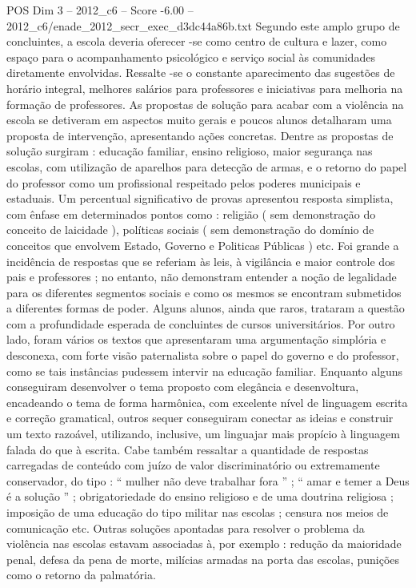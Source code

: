 \begin{textsample}{POS Dim 3 – 2012\_c6 – Score -6.00 – 2012\_c6/enade\_2012\_secr\_exec\_d3dc44a86b.txt}
Segundo este amplo grupo de concluintes, a escola deveria oferecer -se como centro de cultura e lazer, como espaço para o acompanhamento psicológico e serviço social às comunidades diretamente envolvidas.
Ressalte -se o constante aparecimento das sugestões de horário integral, melhores salários para professores e iniciativas para melhoria na formação de professores.
As propostas de solução para acabar com a violência na escola se detiveram em aspectos muito gerais e poucos alunos detalharam uma proposta de intervenção, apresentando ações concretas.
Dentre as propostas de solução surgiram : educação familiar, ensino religioso, maior segurança nas escolas, com utilização de aparelhos para detecção de armas, e o retorno do papel do professor como um profissional respeitado pelos poderes municipais e estaduais.
Um percentual significativo de provas apresentou resposta simplista, com ênfase em determinados pontos como : religião ( sem demonstração do conceito de laicidade ), políticas sociais ( sem demonstração do domínio de conceitos que envolvem Estado, Governo e Politicas Públicas ) etc.
Foi grande a incidência de respostas que se referiam às leis, à vigilância e maior controle dos pais e professores ; no entanto, não demonstram entender a noção de legalidade para os diferentes segmentos sociais e como os mesmos se encontram submetidos a diferentes formas de poder.
Alguns alunos, ainda que raros, trataram a questão com a profundidade esperada de concluintes de cursos universitários.
Por outro lado, foram vários os textos que apresentaram uma argumentação simplória e desconexa, com forte visão paternalista sobre o papel do governo e do professor, como se tais instâncias pudessem intervir na educação familiar.
Enquanto alguns conseguiram desenvolver o tema proposto com elegância e desenvoltura, encadeando o tema de forma harmônica, com excelente nível de linguagem escrita e correção gramatical, outros sequer conseguiram conectar as ideias e construir um texto razoável, utilizando, inclusive, um linguajar mais propício à linguagem falada do que à escrita.
Cabe também ressaltar a quantidade de respostas carregadas de conteúdo com juízo de valor discriminatório ou extremamente conservador, do tipo : “ mulher não deve trabalhar fora ” ; “ amar e temer a Deus é a solução ” ; obrigatoriedade do ensino religioso e de uma doutrina religiosa ; imposição de uma educação do tipo militar nas escolas ; censura nos meios de comunicação etc.
Outras soluções apontadas para resolver o problema da violência nas escolas estavam associadas à, por exemplo : redução da maioridade penal, defesa da pena de morte, milícias armadas na porta das escolas, punições como o retorno da palmatória.

\end{textsample}
